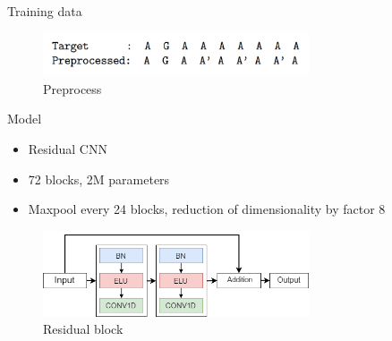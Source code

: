 \documentclass[10pt]{beamer}
\begin{document}
\begin{frame}[fragile]{Training data}
	\begin{figure}
		\begin{center}
			\includegraphics[width=0.7\textwidth]{./imgs/preprocess.png}%
			\caption{Preprocess}
		\end{center}
	\end{figure}
\end{frame}

\begin{frame}[fragile]{Model}
	\begin{itemize}
		\item<1-> Residual CNN
		\item<2-> 72 blocks, 2M parameters
		\item<3-> Maxpool every 24 blocks, reduction of dimensionality by factor 8
	\end{itemize}
	 {
		\begin{figure}
			\begin{center}
				\includegraphics[width=0.7\textwidth]{./imgs/model/block_small.png}%
				\caption{Residual block}	
			\end{center}
		\end{figure}
	}
\end{frame}


\end{document}
